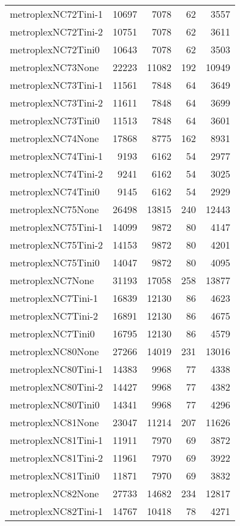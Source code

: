 \begin{longtable}{lrrrr}
metroplexNC72Tini-1 & 10697 & 7078 & 62 & 3557 \\
metroplexNC72Tini-2 & 10751 & 7078 & 62 & 3611 \\
metroplexNC72Tini0 & 10643 & 7078 & 62 & 3503 \\
metroplexNC73None & 22223 & 11082 & 192 & 10949 \\
metroplexNC73Tini-1 & 11561 & 7848 & 64 & 3649 \\
metroplexNC73Tini-2 & 11611 & 7848 & 64 & 3699 \\
metroplexNC73Tini0 & 11513 & 7848 & 64 & 3601 \\
metroplexNC74None & 17868 & 8775 & 162 & 8931 \\
metroplexNC74Tini-1 & 9193 & 6162 & 54 & 2977 \\
metroplexNC74Tini-2 & 9241 & 6162 & 54 & 3025 \\
metroplexNC74Tini0 & 9145 & 6162 & 54 & 2929 \\
metroplexNC75None & 26498 & 13815 & 240 & 12443 \\
metroplexNC75Tini-1 & 14099 & 9872 & 80 & 4147 \\
metroplexNC75Tini-2 & 14153 & 9872 & 80 & 4201 \\
metroplexNC75Tini0 & 14047 & 9872 & 80 & 4095 \\
metroplexNC7None & 31193 & 17058 & 258 & 13877 \\
metroplexNC7Tini-1 & 16839 & 12130 & 86 & 4623 \\
metroplexNC7Tini-2 & 16891 & 12130 & 86 & 4675 \\
metroplexNC7Tini0 & 16795 & 12130 & 86 & 4579 \\
metroplexNC80None & 27266 & 14019 & 231 & 13016 \\
metroplexNC80Tini-1 & 14383 & 9968 & 77 & 4338 \\
metroplexNC80Tini-2 & 14427 & 9968 & 77 & 4382 \\
metroplexNC80Tini0 & 14341 & 9968 & 77 & 4296 \\
metroplexNC81None & 23047 & 11214 & 207 & 11626 \\
metroplexNC81Tini-1 & 11911 & 7970 & 69 & 3872 \\
metroplexNC81Tini-2 & 11961 & 7970 & 69 & 3922 \\
metroplexNC81Tini0 & 11871 & 7970 & 69 & 3832 \\
metroplexNC82None & 27733 & 14682 & 234 & 12817 \\
metroplexNC82Tini-1 & 14767 & 10418 & 78 & 4271 \\

\end{longtable}
